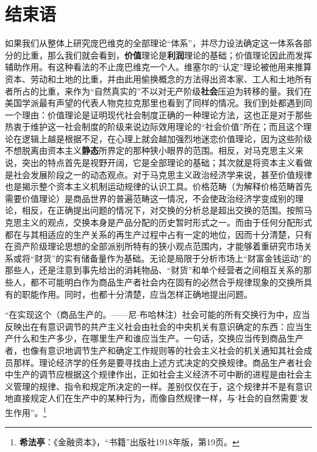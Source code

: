 \documentclass[fontset=fandol, a4paper, 12pt, openright]{ctexbook}
\begin{document}

\chapter*{结束语}

如果我们从整体上研究庞巴维克的全部理论“体系”，并尽力设法确定这一体系各部分的比重，那么我们就会看到，\textbf{价值}理论是\textbf{利润}理论的基础；价值理论因此而发挥辅助作用。有这种看法的不止庞巴维克一个人。维塞尔的“认定”理论被他用来推算资本、劳动和土地的比重，并由此用偷换概念的方法得出资本家、工人和土地所有者所占的比重，来作为“自然真实的”不以对无产阶级\textbf{社会}压迫为转移的量。我们在美国学派最有声望的代表人物克拉克那里也看到了同样的情况。我们到处都遇到同一个理由：价值理论是证明现代社会制度正确的一种理论方法，这也正是对于那些热衷于维护这一社会制度的阶级来说边际效用理论的“社会价值”所在；而且这个理论在逻辑上越是根据不足，在心理上就会越加强烈地迷恋价值理论，因为这些阶级不想脱离由资本主义\textbf{静态}所界定的那种狭小眼界的范围。相反，对马克思主义来说，突出的特点首先是视野开阔，它是全部理论的基础；其次就是将资本主义看做是社会发展阶段之一的动态观点。对于马克思主义政治经济学来说，甚至价值规律也是揭示整个资本主义机制运动规律的认识工具。价格范畴（为解释价格范畴首先需要价值理论）是商品世界的普遍范畴这一情况，不会使政治经济学变成别的理论，相反，在正确提出问题的情况下，对交换的分析总是超出交换的范围。按照马克思主义的观点，交换本身是产品分配的历史暂时形式之一。而由于任何分配形式都在与其相适应的生产关系的再生产过程中占有一定的地位，因而十分清楚，只有在资产阶级理论思想的全部派别所特有的狭小观点范围内，才能够着重研究市场关系或将“财货”的实有储备量作为基础。无论是局限于分析市场上“财富金钱运动”的那些人，还是注意到事先给出的消耗物品、“财货”和单个经营者之间相互关系的那些人，都不可能明白作为商品生产者社会内在固有的必然合乎规律现象的交换所具有的职能作用。同时，也都十分清楚，应当怎样正确地提出问题。

“在实现这个（商品生产的。——尼$\cdot$布哈林注）社会可能的所有交换行为中，应当反映出在有意识调节的共产主义社会由社会的中央机关有意识确定的东西：应当生产什么和生产多少，在哪里生产和谁应当生产。一句话，交换应当传到商品生产者，也像有意识地调节生产和确定工作规则等的社会主义社会的机关通知其社会成员那样。理论经济学的任务是要寻找由上述方式决定的交换规律。商品生产者社会中生产的调节应根据这个规律作出，正如社会主义经济不可中断的进程是由社会主义管理的规律、指令和规定所决定的一样。差别仅仅在于，这个规律并不是有意识地直接规定人们在生产中的某种行为，而像自然规律一样，与‘社会的自然需要’发生作用”。\footnote{\textbf{希法亭}：《金融资本》，“书籍”出版社1918年版，第19页。}
\end{document}
